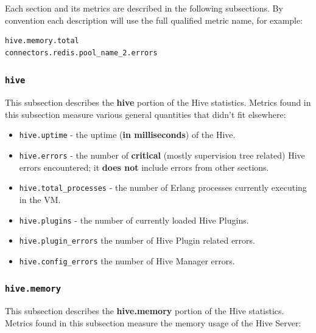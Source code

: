 \documentclass[a4paper]{article}
\begin{document}
Each section and its metrics are described in the following subsections. By convention each description will use the full qualified metric name, for example:


\begin{verbatim}
hive.memory.total
connectors.redis.pool_name_2.errors
\end{verbatim}
\subsubsection{\texttt{hive}}
\label{sec-4-2-1}

This subsection describes the \textbf{hive} portion of the Hive statistics. Metrics found in this subsection measure various general quantities that didn't fit elsewhere:


\begin{itemize}
\item \texttt{hive.uptime} - the uptime (\textbf{in milliseconds}) of the Hive.
\item \texttt{hive.errors} - the number of \textbf{critical} (mostly supervision tree related) Hive errors encountered; it \textbf{does not} include errors from other sections.
\item \texttt{hive.total\_processes} - the number of Erlang processes currently executing in the VM.
\item \texttt{hive.plugins} - the number of currently loaded Hive Plugins.
\item \texttt{hive.plugin\_errors} the number of Hive Plugin related errors.
\item \texttt{hive.config\_errors} the number of Hive Manager errors.
\end{itemize}
\subsubsection{\texttt{hive.memory}}
\label{sec-4-2-2}

This subsection describes the \textbf{hive.memory} portion of the Hive statistics. Metrics found in this subsection measure the memory usage of the Hive Server:
\end{document}
